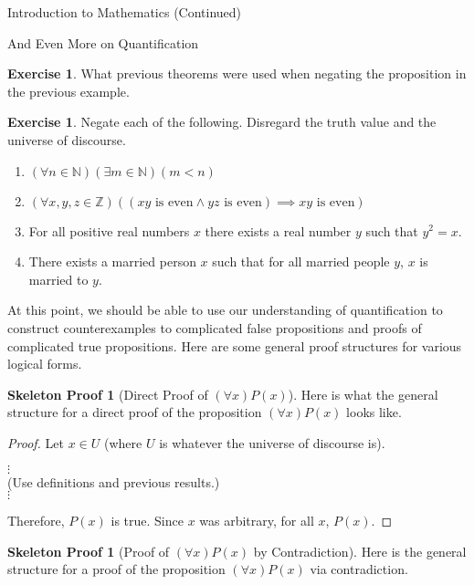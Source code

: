 \documentclass[11pt]{article}
\theoremstyle{definition}
\newtheorem{exercise}[theorem]{Exercise}
\newtheorem{skeleton}[theorem]{Skeleton Proof}
\newenvironment{textbox}{\noindent\begin{lrbox}{\savepar}\begin{minipage}[c]{.98\textwidth}}{\end{minipage}\end{lrbox}\fcolorbox{black}{white}{\usebox{\savepar}}}
\begin{document}
\begin{section}{Introduction to Mathematics (Continued)}
\begin{subsection}{And Even More on Quantification}
\begin{exercise}
What previous theorems were used when negating the proposition in the previous example.
\end{exercise}

\begin{exercise}
Negate each of the following.  Disregard the truth value and the universe of discourse.
\begin{enumerate}
\item $(\forall n\in\mathbb{N})(\exists m\in\mathbb{N})(m<n)$
\item $(\forall x,y,z\in\mathbb{Z})((xy \mbox{ is even}\wedge yz\mbox{ is even})\implies xy\mbox{ is even})$
\item For all positive real numbers $x$ there exists a real number $y$ such that $y^2=x$.
\item There exists a married person $x$ such that for all married people $y$, $x$ is married to $y$.
\end{enumerate}
\end{exercise}

At this point, we should be able to use our understanding of quantification to construct counterexamples to complicated false propositions and proofs of complicated true propositions.  Here are some general proof structures for various logical forms.

\begin{skeleton}[Direct Proof of $(\forall x)P(x)$]
Here is what the general structure for a direct proof of the proposition $(\forall x)P(x)$ looks like.

\bigskip

\begin{textbox}
\begin{proof}
Let $x \in U$ (where $U$ is whatever the universe of discourse is).
\begin{center}
$\vdots$\\
(Use definitions and previous results.)\\
$\vdots$
\end{center}
\noindent Therefore, $P(x)$ is true.  Since $x$ was arbitrary, for all $x$, $P(x)$.
\end{proof}
\end{textbox}

\end{skeleton}

\begin{skeleton}[Proof of $(\forall x)P(x)$ by Contradiction]
Here is the general structure for a proof of the proposition $(\forall x)P(x)$ via contradiction.


\end{skeleton}
\end{subsection}
\end{section}
\end{document}
